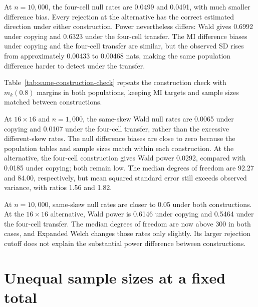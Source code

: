 At \(n=10{,}000\), the four-cell null rates are 0.0499 and 0.0491,
with much smaller difference bias. Every rejection at the alternative
has the correct estimated direction under either construction.
Power nevertheless differs: Wald gives 0.6992 under copying and
0.6323 under the four-cell transfer. The MI difference biases under
copying and the four-cell transfer are similar, but the
observed SD rises from approximately 0.00433 to 0.00468 nats, making
the same population difference harder to detect under the transfer.

\medskip
{}

Table~\ref{tab:same-construction-check} repeats the construction check
with \(m_k(0.8)\) margins in both populations, keeping MI targets and
sample sizes matched between constructions.

\begin{table}[H]
\centering
\small
\setlength{\tabcolsep}{4pt}
\caption{Same-skew comparisons under copying and four-cell constructions.}
\label{tab:same-construction-check}

\end{table}

At \(16\times16\) and \(n=1{,}000\), the same-skew Wald null
rates are 0.0065 under copying and 0.0107 under the four-cell transfer,
rather than the excessive different-skew rates. The null difference
biases are close to zero because the population tables and sample sizes
match within each construction. At the alternative, the four-cell
construction gives Wald power 0.0292, compared with 0.0185 under copying;
both remain low. The median degrees of freedom are 92.27 and 84.00,
respectively, but mean squared standard error still exceeds observed
variance, with ratios 1.56 and 1.82.

At \(n=10{,}000\), same-skew null rates are closer to 0.05 under
both constructions. At the \(16\times16\) alternative, Wald power
is 0.6146 under copying and 0.5464 under the four-cell transfer. The
median degrees of freedom are now above 300 in both cases, and Expanded
Welch changes those rates only slightly. Its larger rejection cutoff
does not explain the substantial power difference between constructions.

\section{Unequal sample sizes at a fixed total}
\label{sec:allocation-check}

